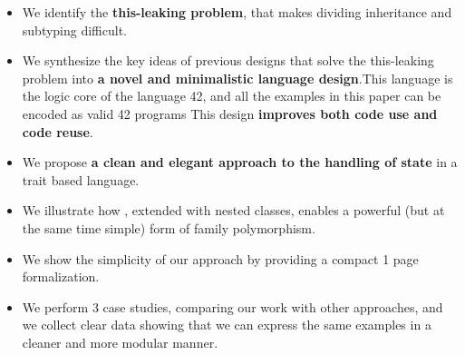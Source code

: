 




\begin{itemize}
\item We identify the {\bf this-leaking problem}, that makes dividing inheritance and subtyping difficult.

\item We synthesize the key ideas of previous designs that solve the
  this-leaking problem into {\bf a novel and
  minimalistic language design}.This language is the logic core of the language 42, and 
  all the examples in this paper can be encoded as valid 42 programs
This design {\bf improves both code use and code reuse}.

\item We propose {\bf a clean and elegant approach to the handling of state} in a trait based language.

\item We illustrate how \name, extended with nested classes, enables a
  powerful (but at the same time simple) form of family polymorphism. %
\item We show the simplicity of our approach by providing a compact 1 page formalization.
\item We perform 3 case studies, comparing our work with other
  approaches, and we collect clear data showing that we can express the same examples in a cleaner and more modular manner.
\end{itemize}
\saveSpace
\saveSpace

